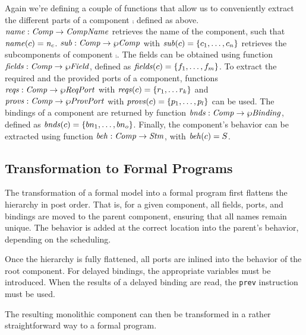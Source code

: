 \documentclass[a4paper,10pt,english]{article}
\begin{document}
Again we're defining a couple of functions that allow us to conveniently extract the different parts of a component $\comp$
defined as above. $\mathit{name} : \mathit{Comp} \rightarrow \mathit{CompName}$ retrieves the name of the component, such that
$\mathit{name}(c) = \mathit{n_c}$. $\mathit{sub} : \mathit{Comp} \rightarrow \wp \mathit{Comp}$ with $\mathit{sub}(c) = \{c_1, \ldots, c_n\}$
retrieves the subcomponents of component $\comp$. The fields can be obtained using function $\mathit{fields} : \mathit{Comp} \rightarrow
\wp \mathit{Field}$, defined as $\mathit{fields}(c) = \{ f_1, \ldots, f_m \}$. To extract the required and the provided ports
of a component, functions $\mathit{reqs} : \mathit{Comp} \rightarrow \wp \mathit{ReqPort}$ with $\mathit{reqs}(c) = \{ r_1, \ldots r_k \}$
and $\mathit{provs} : \mathit{Comp} \rightarrow \wp \mathit{ProvPort}$ with $\mathit{provs}(c) = \{ p_1, \ldots, p_l \}$ can be used. The
bindings of a component are returned by function $\mathit{bnds} : \mathit{Comp} \rightarrow \wp \mathit{Binding}$, defined as $\mathit{bnds}(c) =
\{ bn_1, \ldots, bn_o \}$. Finally, the component's behavior can be extracted using function $\mathit{beh} : \mathit{Comp}
\rightarrow \mathit{Stm}$, with $\mathit{beh}(c) = S$.

\subsection{Transformation to Formal Programs}
The transformation of a formal model into a formal program first flattens the hierarchy in post order. That is, for a given
component, all fields, ports, and bindings are moved to the parent component, ensuring that all names remain unique. The behavior
is added at the correct location into the parent's behavior, depending on the scheduling. 

Once the hierarchy is fully flattened, all ports are inlined into the behavior of the root component. For delayed bindings, the
appropriate variables must be introduced. When the results of a delayed binding are read, the \texttt{prev} instruction must be used.

The resulting monolithic component can then be transformed in a rather straightforward way to a formal program.
\end{document}
